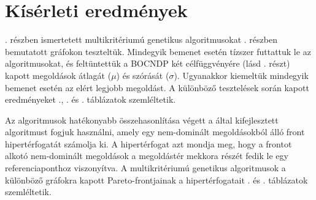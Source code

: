 \clearpage
\section{Kísérleti eredmények}


. részben ismertetett multikritériumú genetikus algoritmusokat . részben bemutatott gráfokon teszteltük.
Mindegyik bemenet esetén tízszer futtattuk le az algoritmusokat, és feltüntettük a BOCNDP két célfüggvényére (lásd . részt) kapott megoldások átlagát ($\mu$) és szórását ($\sigma$).
Ugyanakkor kiemeltük mindegyik bemenet esetén az elért legjobb megoldást.
A különböző tesztelések során kapott eredményeket ., . és . táblázatok szemléltetik.

Az algoritmusok hatékonyabb összehasonlítása végett a  által kifejlesztett algoritmust fogjuk használni, amely egy nem-dominált megoldásokból álló front hipertérfogatát számolja ki.
A hipertérfogat azt mondja meg, hogy a frontot alkotó nem-dominált megoldások a megoldástér mekkora részét fedik le egy referenciaponthoz viszonyítva.
A multikritériumú genetikus algoritmusok a különböző gráfokra kapott Pareto-frontjainak a hipertérfogatait . és . táblázatok szemléltetik.


